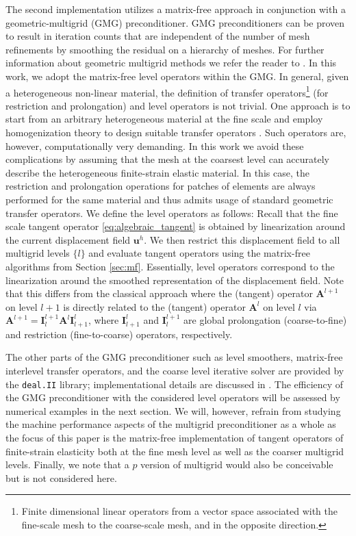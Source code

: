 \documentclass[AMA,STIX1COL]{WileyNJD-v2}
\newcommand*{\gz}[1]{\boldsymbol{#1}}
\begin{document}
The second implementation utilizes a matrix-free approach in conjunction with a geometric-multigrid (GMG) preconditioner.
GMG preconditioners \cite{Bramble1990, Briggs2000, Janssen2011,May2015} can be proven to result in iteration counts that are independent of the number of mesh refinements by smoothing the residual on a hierarchy of meshes.
For further information about geometric multigrid methods we refer the reader to \cite{Briggs2000,Hackbusch1985,Wesseling1992}.
%
%
In this work, we adopt the matrix-free level operators within the GMG.
In general, given a heterogeneous non-linear material, the definition of transfer operators\footnote{Finite dimensional linear operators from a vector space associated with the fine-scale mesh to the coarse-scale mesh, and in the opposite direction.} (for restriction and prolongation) and level operators is not trivial. One approach is to start from an arbitrary heterogeneous material at the fine scale and employ homogenization theory \cite{Suquet1987, Hill1972,Hashin1983,Castaneda1997} to design suitable transfer operators \cite{Miehe2007}.
Such operators are, however, computationally very demanding.
In this work we avoid these complications by assuming
that the mesh at the coarsest level can accurately describe the heterogeneous finite-strain elastic material.
In this case, the restriction and prolongation operations for patches of elements are always performed for the same material and thus admits usage of standard geometric transfer operators.
We define the level operators as follows: Recall that the fine scale tangent operator \eqref{eq:algebraic_tangent} is obtained by linearization around the current displacement field $\gz u^h$. We then restrict this displacement field to all multigrid levels $\{l\}$ and evaluate tangent operators using the matrix-free algorithms from Section \ref{sec:mf}.
Essentially, level operators correspond to the linearization around the smoothed representation of the displacement field.
Note that this differs from the classical approach where the (tangent) operator $\gz A^{l+1}$ on level $l+1$ is directly related to the (tangent) operator $\gz A^{l}$ on level $l$ via $\gz A^{l+1}=\gz I^{l+1}_{l} \gz A^l \gz I^l_{l+1}$, where $\gz I^l_{l+1}$ and $\gz I^{l+1}_l$ are global prolongation (coarse-to-fine) and restriction (fine-to-coarse) operators, respectively.

The other parts of the GMG preconditioner such as level smoothers, matrix-free interlevel transfer operators, and the coarse level iterative solver are provided by the \texttt{deal.II} library; implementational details are discussed in \cite{Clevenger2018}.
%
The efficiency of the GMG preconditioner with the considered level operators will be assessed by numerical examples in the next section.
We will, however, refrain from studying the machine performance aspects of the multigrid preconditioner as a whole as the focus of this paper is the matrix-free implementation of tangent operators of finite-strain elasticity both at the fine mesh level as well as the coarser multigrid levels.
%
Finally, we note that a $p$ version of multigrid \cite{Ronquist1987} would also be conceivable but is not considered here.
\end{document}
